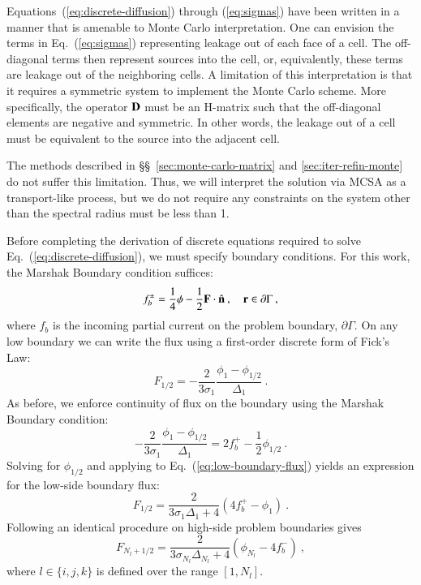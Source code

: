 \documentclass[preprint,12pt]{elsarticle}
\newcommand{\vr}{\ensuremath{\ve{r}}}
\begin{document}
Equations~(\ref{eq:discrete-diffusion}) through (\ref{eq:sigmas}) have been
written in a manner that is amenable to Monte Carlo interpretation.  One can
envision the terms in Eq.~(\ref{eq:sigmas}) representing leakage out of each
face of a cell.  The off-diagonal terms then represent sources into the cell,
or, equivalently, these terms are leakage out of the neighboring cells.  A
limitation of this interpretation is that it requires a symmetric system to
implement the Monte Carlo scheme.  More specifically, the operator $\mathbf{D}$
must be an H-matrix \cite{kelley_1995} such that the off-diagonal elements are
negative and symmetric.  In other words, the leakage out of a cell must be
equivalent to the source into the adjacent cell.

The methods described in \S\S~\ref{sec:monte-carlo-matrix} and
\ref{sec:iter-refin-monte} do not suffer this limitation.  Thus, we will
interpret the solution via MCSA as a transport-like process, but we do not
require any constraints on the system other than the spectral radius must be
less than 1.

Before completing the derivation of discrete equations required to solve
Eq.~(\ref{eq:discrete-diffusion}), we must specify boundary conditions.  For
this work, the Marshak Boundary condition suffices:
\begin{equation}
  f_b^\pm = \frac{1}{4}\phi -
  \frac{1}{2}\ve{F}\cdot\hat{\ve{n}}\:,\quad \vr\in \partial\Gamma\:,
\end{equation}
where $f_b$ is the incoming partial current on the problem boundary,
$\partial\Gamma$.  On any low boundary we can write the flux using a
first-order discrete form of Fick's Law:
\begin{equation}
  F_{1/2} = -\frac{2}{3\sigma_1}\frac{\phi_1 -
    \phi_{1/2}}{\Delta_1}\:.
  \label{eq:low-boundary-flux}
\end{equation}
As before, we enforce continuity of flux on the boundary using the
Marshak Boundary condition:
\begin{equation}
  -\frac{2}{3\sigma_1}\frac{\phi_1 - \phi_{1/2}}{\Delta_1} = 2f_b^{+}
  -\frac{1}{2}\phi_{1/2}\:.
\end{equation}
Solving for $\phi_{1/2}$ and applying to Eq.~(\ref{eq:low-boundary-flux})
yields an expression for the low-side boundary flux:
\begin{equation}
  F_{1/2} = \frac{2}{3\sigma_1\Delta_1 + 4}(4f_b^{+}-\phi_1)\:.
\end{equation}
Following an identical procedure on high-side problem boundaries gives
\begin{equation}
  F_{N_l+1/2} = \frac{2}{3\sigma_{N_l}\Delta_{N_l} +
    4}(\phi_{N_l}-4f_b^{-})\:,
\end{equation}
where $l\in\{i,j,k\}$ is defined over the range $[1,N_l]$.
\end{document}
